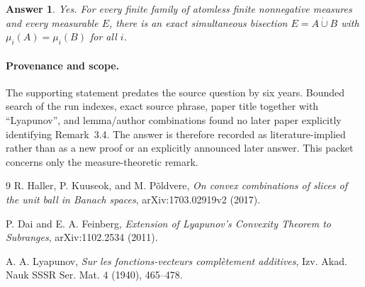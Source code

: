\documentclass[11pt]{article}
\newtheorem*{answer}{Answer}
\begin{document}
\begin{answer}
Yes.  For every finite family of atomless finite nonnegative measures and
every measurable $E$, there is an exact simultaneous bisection
$E=A\mathbin{\dot\cup}B$ with $\mu_i(A)=\mu_i(B)$ for all $i$.
\end{answer}

\paragraph{Provenance and scope.}
The supporting statement predates the source question by six years.  Bounded
search of the run indexes, exact source phrase, paper title together with
``Lyapunov'', and lemma/author combinations found no later paper explicitly
identifying Remark~3.4.  The answer is therefore recorded as
literature-implied rather than as a new proof or an explicitly announced
later answer.  This packet concerns only the measure-theoretic remark.

\begin{thebibliography}{9}
R. Haller, P. Kuuseok, and M. P\~oldvere,
\emph{On convex combinations of slices of the unit ball in Banach spaces},
arXiv:1703.02919v2 (2017).

P. Dai and E. A. Feinberg,
\emph{Extension of Lyapunov's Convexity Theorem to Subranges},
arXiv:1102.2534 (2011).

A. A. Lyapunov,
\emph{Sur les fonctions-vecteurs compl\`etement additives},
Izv. Akad. Nauk SSSR Ser. Mat. 4 (1940), 465--478.
\end{thebibliography}
\end{document}
